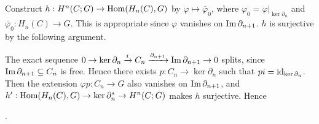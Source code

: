 \documentclass[11pt]{article}
\theoremstyle{definition}
\theoremstyle{plain}
\newcommand{\id}{\textup{id}}
\newcommand{\im}{\textup{Im}\,}
\newcommand{\Hom}{\textup{Hom}}
\newcommand{\1}{\mathbf{1}}
\begin{document}
Construct $h:H^n(C;G)\to\Hom(H_n(C),G)$ by $\varphi\mapsto\overline{\varphi}_0$, where $\varphi_0=\varphi|_{\ker\partial_n}$ and $\overline{\varphi}_0:H_n(C)\to G$. This is appropriate since $\varphi$ vanishes on $\im\partial_{n+1}$. $h$ is surjective by the following argument.\medbreak

The exact sequence $0\rightarrow\ker\partial_n\xrightarrow{i}C_n\xrightarrow{\partial_{n+1}}\im\partial_{n+1}\rightarrow0$ splits, since $\im\partial_{n+1}\subseteq C_n$ is free. Hence there exists $p:C_n\to\ker\partial_n$ such that $pi=\id_{\ker\partial_n}$. Then the extension $\varphi p:C_n\to G$ also vanishes on $\im\partial_{n+1}$, and $h':\Hom(H_n(C),G)\rightarrow\ker\partial^\ast_n\rightarrow H^n(C;G)$ makes $h$ surjective. Hence
\begin{center}.\end{center}
\end{document}
